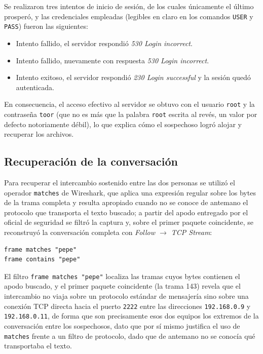 \begin{respuesta}
  Se realizaron tres intentos de inicio de sesión, de los cuales únicamente el último prosperó, y las credenciales empleadas (legibles en claro en los comandos \texttt{USER} y \texttt{PASS}) fueron las siguientes:
  \begin{itemize}
    \item {} Intento fallido, el servidor respondió \emph{530 Login incorrect}.
    \item {} Intento fallido, nuevamente con respuesta \emph{530 Login incorrect}.
    \item {} Intento exitoso, el servidor respondió \emph{230 Login successful} y la sesión quedó autenticada.
  \end{itemize}
  En consecuencia, el acceso efectivo al servidor se obtuvo con el usuario \texttt{root} y la contraseña \texttt{toor} (que no es más que la palabra \texttt{root} escrita al revés, un valor por defecto notoriamente débil), lo que explica cómo el sospechoso logró alojar y recuperar los archivos.
\end{respuesta}

\subsection{Recuperación de la conversación}

Para recuperar el intercambio sostenido entre las dos personas se utilizó el operador \texttt{matches} de Wireshark, que aplica una expresión regular sobre los bytes de la trama completa y resulta apropiado cuando no se conoce de antemano el protocolo que transporta el texto buscado; a partir del apodo entregado por el oficial de seguridad se filtró la captura y, sobre el primer paquete coincidente, se reconstruyó la conversación completa con \emph{Follow $\rightarrow$ TCP Stream}:

\begin{lstlisting}
frame matches "pepe"
frame contains "pepe"
\end{lstlisting}


\begin{analisis}
  El filtro \texttt{frame matches "pepe"} localiza las tramas cuyos bytes contienen el apodo buscado, y el primer paquete coincidente (la trama 143) revela que el intercambio no viaja sobre un protocolo estándar de mensajería sino sobre una conexión TCP directa hacia el puerto \texttt{2222} entre las direcciones \texttt{192.168.0.9} y \texttt{192.168.0.11}, de forma que son precisamente esos dos equipos los extremos de la conversación entre los sospechosos, dato que por sí mismo justifica el uso de \texttt{matches} frente a un filtro de protocolo, dado que de antemano no se conocía qué transportaba el texto.
\end{analisis}

